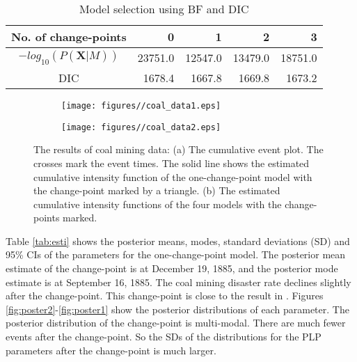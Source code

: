 \documentclass[12pt]{article}
\numberwithin{equation}{section}
\begin{document}
 \begin{table}[htbp]
   \centering
   \label{tbcoal}
   \caption{Model selection using BF and DIC}
     \begin{tabular}{crrrr}
         \hline
     No. of change-points & 0     & 1     & 2     & 3 \\
         \hline
     $-log_{10}(P(\pmb X|M))$ & \multicolumn{1}{r}{23751.0} & \multicolumn{1}{r}{12547.0} & \multicolumn{1}{r}{13479.0} & \multicolumn{1}{r}{18751.0} \\
     DIC   & 1678.4 & 1667.8 & 1669.8 & 1673.2 \\
         \hline
     \end{tabular}%
   \label{tab:data1}%
 \end{table}%

 
 
 \begin{figure}

     \centering
     \begin{subfigure}[b]{0.45\textwidth}
         \centering
         \texttt{[image: figures//coal\_data1.eps]}
         \caption{}
         \label{}
     \end{subfigure}
     \hfill
     \begin{subfigure}[b]{0.45\textwidth}
         \centering
         \texttt{[image: figures//coal\_data2.eps]}
         \caption{}
         \label{}
     \end{subfigure}
         \caption{The results of coal mining data: (a) The cumulative event plot. The crosses mark the event times. The solid line shows the estimated cumulative intensity function of the one-change-point model with the change-point marked by a triangle. (b) The estimated cumulative intensity functions of the four models with the change-points marked.}
        \label{fig:coal_data}
\end{figure}

Table \ref{tab:esti} shows the posterior means, modes, standard deviations (SD) and 95\% CIs of the parameters for the one-change-point model. The posterior mean estimate of the change-point is at December 19, 1885, and the posterior mode estimate is at September 16, 1885. The coal mining disaster rate declines slightly after the change-point. This change-point is close to the result in \citet{Raftery1986}. Figures \ref{fig:poster2}-\ref{fig:poster1} show the posterior distributions of each parameter. The posterior distribution of the change-point is multi-modal. There are much fewer events after the change-point. So the SDs of the distributions for the PLP parameters after the change-point is much larger.  
\end{document}
